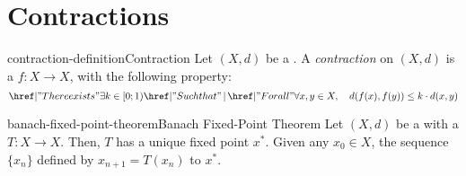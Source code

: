 \documentclass[preview]{standalone}
\begin{document}
\section{Contractions}

\begin{snippetdefinition}{contraction-definition}{Contraction}
    Let \((X, d)\) be a \metricspace.
    A \textit{contraction} on \((X, d)\) is a \function \(f\colon X \to X\),
    with the following property:
    \[
        \exists k \in [0;1) \suchthat \forall x,y \in X, \quad d(f(x), f(y)) \leq k\cdot d(x,y)
    \]
\end{snippetdefinition}


\begin{snippettheorem}{banach-fixed-point-theorem}{Banach Fixed-Point Theorem}
    Let \((X, d)\) be a \mscomplete \metricspace with a \contraction \(T\colon X\to X\).
    Then, \(T\) has a unique fixed point \(x^*\). Given any \(x_0\in X\), 
    the sequence \(\{x_n\}\) defined by \(x_{n+1}=T(x_n)\) \msconvergence[converges] to \(x^*\).
\end{snippettheorem}
\end{document}
